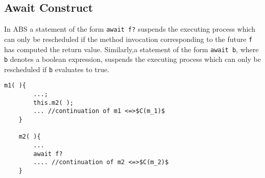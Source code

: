 





\subsection{Await Construct}
In ABS a statement of the form \lstinline|await f?|
suspends the executing process which can only be rescheduled if the method
invocation corresponding to the future \lstinline|f| has computed the return value.
Similarly,a statement of the form \lstinline|await b|, where \lstinline|b| denotes a boolean expression, suspends the executing process which can only be rescheduled if \lstinline|b| evaluates to true.

%
\begin{lstlisting}[caption=ABS Example, label=ex]
	m1( ){
		...;
		this.m2( );
		...	//continuation of m1 <=>$C(m_1)$
	}

	m2( ){
		...
		await f?
		.... //continuation of m2 <=>$C(m_2)$
	}
\end{lstlisting}

